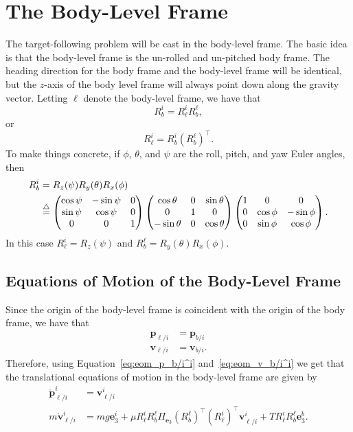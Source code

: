 \section{The Body-Level Frame}

The target-following problem will be cast in the body-level frame.  The basic idea is that the body-level frame is the un-rolled and un-pitched body frame.  The heading direction for the body frame and the body-level frame will be identical, but the $z$-axis of the body level frame will always point down along the gravity vector.
Letting $\ell$ denote the body-level frame, we have that
\[
R_b^i = R_\ell^i R_b^\ell,
\]
or 
\[
R_\ell^i =  R_b^i (R_b^\ell)^\top.
\]
To make things concrete, if $\phi$, $\theta$, and $\psi$ are the roll, pitch, and yaw Euler angles, then 
\begin{align*}
R_b^i &= R_z(\psi) R_y(\theta) R_x(\phi) \\
	&\stackrel{\triangle}{=} \begin{pmatrix} \cos\psi & -\sin\psi & 0 \\ \sin\psi & \cos\psi & 0 \\ 0 & 0 & 1 \end{pmatrix}
	\begin{pmatrix} \cos\theta & 0 & \sin\theta \\ 0 & 1 & 0 \\ -\sin\theta & 0 & \cos\theta \end{pmatrix}
	\begin{pmatrix} 1 & 0 & 0 \\ 0 & \cos\phi & -\sin\phi \\ 0 & \sin\phi & \cos\phi \end{pmatrix}.
\end{align*}
In this case $R_\ell^i = R_z(\psi)$ and $R_b^\ell = R_y(\theta)R_x(\phi)$.


\subsection{Equations of Motion of the Body-Level Frame}

Since the origin of the body-level frame is coincident with the origin of the body frame, we have that
\begin{align*}
\mathbf{p}_{\ell/i} &= \mathbf{p}_{b/i} \\	
\mathbf{v}_{\ell/i} &= \mathbf{v}_{b/i}.
\end{align*}
Therefore, using Equation~\eqref{eq:eom_p_b/i^i} and~\eqref{eq:eom_v_b/i^i} we get that the translational equations of motion in the body-level frame are given by
\begin{align*}
	\dot{\mathbf{p}}_{\ell/i}^i &= \mathbf{v}_{\ell/i}^i\\
	m\dot{\mathbf{v}}_{\ell/i}^i &= mg\mathbf{e}_3^i + \mu R_\ell^i R_b^\ell \Pi_{\mathbf{e}_3}(R_b^\ell)^\top (R_\ell^i)^\top \mathbf{v}_{\ell/i}^i + TR_\ell^i R_b^\ell \mathbf{e}_3^b.
\end{align*}

